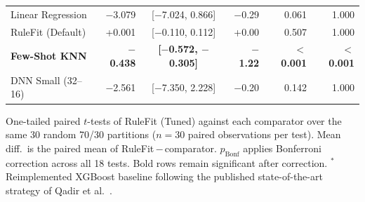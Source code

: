 \begin{table}[h]
\begin{tabular}{@{}lrcrrr@{}}
Linear Regression & $-$3.079 & [$-$7.024, 0.866] & $-$0.29 & 0.061 & 1.000 \\
RuleFit (Default) & +0.001 & [$-$0.110, 0.112] & +0.00 & 0.507 & 1.000 \\
\textbf{Few-Shot KNN} & \textbf{$-$0.438} & \textbf{[$-$0.572, $-$0.305]} & \textbf{$-$1.22} & \textbf{$<$0.001} & \textbf{$<$0.001} \\
DNN Small (32--16) & $-$2.561 & [$-$7.350, 2.228] & $-$0.20 & 0.142 & 1.000 \\
\hline
\end{tabular}
\vspace{1mm}
\scriptsize{One-tailed paired $t$-tests of RuleFit (Tuned) against each comparator over the same 30 random 70/30 partitions ($n=30$ paired observations per test). Mean diff.\ is the paired mean of RuleFit\,$-$\,comparator. $p_{\mathrm{Bonf}}$ applies Bonferroni correction across all 18 tests. Bold rows remain significant after correction. $^{*}$Reimplemented XGBoost baseline following the published state-of-the-art strategy of Qadir et al.~\cite{qadir2024predicting}.}
\end{table}
